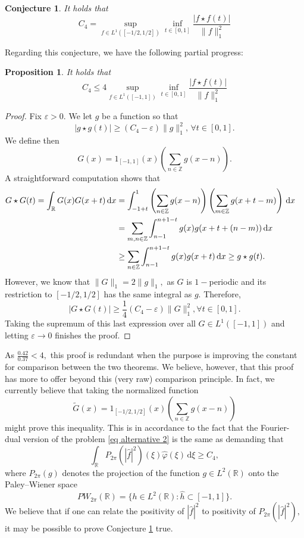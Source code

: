 \documentclass[11pt, reqno]{amsart}
\newcommand{\mmd}{ \mathrm{d}}
\newcommand{\s}{\star}
\numberwithin{equation}{section}
\newtheorem{proposition}[theorem]{Proposition}
\newtheorem{conjecture}[theorem]{Conjecture}
\newcommand{\R}{{\mathbb R}}
\newcommand{\Z}{{\mathbb Z}}
\newcommand{\eps}{{\varepsilon}}
\begin{document}
\begin{conjecture}\label{conj compact} It holds that 
$$
C_4 = \sup_{f \in L^1([-1/2,1/2])} \inf_{t \in [0,1]} \frac{|f \s f(t)|}{\|f\|_1^2}
$$
\end{conjecture}
Regarding this conjecture, we have the following partial progress: 

\begin{proposition} It holds that
$$
C_4 \le 4 \sup_{f \in L^1([-1,1])} \inf_{t \in [0,1]} \frac{|f \s f(t)|}{\|f\|_1^2}
$$
\end{proposition}

\begin{proof} Fix $\eps > 0.$ We let $g$ be a function so that 
\[
|g \s g(t)| \ge (C_4 - \eps)\|g\|_1^2, \, \forall t \in [0,1].
\]
We define then 
\[
G(x) = 1_{[-1,1]}(x) \left( \sum_{n \in \Z} g(x-n)\right). 
\]
A straightforward computation shows that 
\begin{align*}
G\s G(t) = \int_{\R} G(x) G(x+t) \, \mmd x & = \int_{-1+t}^1 \left(\sum_{n \in \Z} g(x-n) \right)\left(\sum_{m \in \Z} g(x+t-m)\right) \, \mmd x \cr 
 & = \sum_{m,n \in \Z} \int_{n-1}^{n+1-t} g(x)g(x+t + (n-m)) \, \mmd x \cr
 & \ge \sum_{n \in \Z} \int_{n-1}^{n+1-t} g(x)g(x+t) \, \mmd x \ge g \s g(t).
\end{align*}
However, we know that $\|G\|_1 = 2 \|g\|_1,$ as $G$ is $1-$periodic and its restriction to $[-1/2,1/2]$ has the same integral as $g.$ Therefore, 
\[
|G \s G(t)| \ge \frac{1}{4}(C_4 - \eps)\|G\|_1^2, \forall t \in [0,1].
\]
Taking the supremum of this last expression over all $G \in L^1([-1,1])$ and letting $\eps \to 0$ finishes the proof. 
\end{proof}

As $\frac{0.42}{0.37} < 4,$ this proof is redundant when the purpose is improving the constant for comparison between the two theorems. 
We believe, however, that this proof has more to offer beyond this (very raw) comparison principle. In fact, we currently believe that taking the 
normalized function 
\[
\tilde{G}(x) = 1_{[-1/2,1/2]}(x) \left(\sum_{n \in \Z} g(x-n)\right)
\]
might prove this inequality. This is in accordance to the fact that the Fourier-dual version of the problem \eqref{eq alternative 2} is the same as demanding 
that 
\[
\int_{\R} P_{2\pi}(|\widehat{f}|^2)(\xi) \widehat{\varphi}(\xi) \, \mmd \xi \ge C_4,
\]
where $P_{2\pi}(g)$ denotes the projection of the function $g \in L^2(\R)$ onto the Paley--Wiener space 
\[
PW_{2\pi}(\R) = \{ h \in L^2(\R) \colon \widehat{h} \subset [-1,1]\}.
\]
We believe that if one can relate the positivity of $|\widehat{f}|^2$ to positivity of $P_{2\pi}(|\widehat{f}|^2),$ it may be possible to prove 
Conjecture \ref{conj compact} true. 
\end{document}
